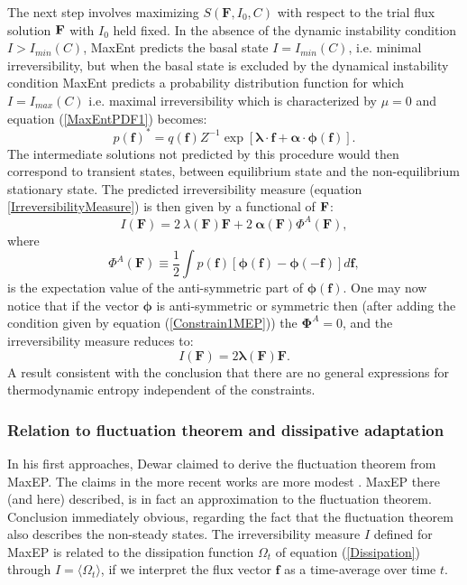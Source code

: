\documentclass[a4paper,12pt]{article}
\begin{document}
The next step involves maximizing $S(\bm{F}, I_0, C)$ with respect to the trial flux solution $\bf{F}$ with $I_0$ held fixed.
In the absence of the dynamic instability condition $I>I_{min}(C)$, MaxEnt predicts the basal state $I=I_{min}(C)$, i.e. minimal irreversibility, but when the basal state is excluded by the dynamical instability condition MaxEnt predicts a probability distribution function for which $I=I_{max}(C)$ i.e. maximal irreversibility which is characterized by $\mu =0$ and equation (\ref{MaxEntPDF1}) becomes:
\begin{equation}
\label{MaxEntPDF2}
  p(\bm{f})^* = q( \bm{f} ) Z^{-1} \exp[\bm{\lambda} \cdot \bm{f}+ \bm{\alpha} \cdot \bm{\phi} (\bm{f})].
\end{equation}
The intermediate solutions not predicted by this procedure would then correspond to transient states, between equilibrium state and the non-equilibrium stationary state.
The predicted irreversibility measure (equation \ref{IrreversibilityMeasure}) is then given by a functional of $\bf{F}$:
\begin{equation}
  I(\bm{F}) =2\ \lambda(\bm{F}) \bm{F} + 2\ \bm{\alpha(\bm{F})} \Phi^A(\bm{F}),
\end{equation}
where 
\begin{equation}
  \Phi^A(\bm{F}) \equiv \frac{1}{2} \int p(\bm{f})[\bm{\phi}(\bm{f})-\bm{\phi}(\bm{-f})]d\bm{f},
\end{equation}
is the expectation value of the anti-symmetric part of $\bm{\phi}(\bm{f})$. One may now notice that if the vector $\bm{\phi}$ is anti-symmetric or symmetric then (after adding the condition given by equation (\ref{Constrain1MEP})) the $\bm{\Phi}^A =0$, and the irreversibility measure reduces to:
\begin{equation}
\label{SymmetricIrreversible}
  I(\bm{F})=2 \bm{\lambda}(\bm{F})\bm{F}.
\end{equation}
A result consistent with the conclusion that there are no general expressions for thermodynamic entropy independent of the constraints.

\subsubsection{Relation to fluctuation theorem and dissipative adaptation}
In his first approaches, Dewar claimed to derive \cite{Dewar:775452, Dewar:2005eo} the fluctuation theorem from MaxEP. The claims in the more recent works are more modest \cite{Dewar:2014ek}. MaxEP there (and here) described, is in fact an approximation to the fluctuation theorem. Conclusion immediately obvious, regarding the fact that the fluctuation theorem also describes the non-steady states.
The irreversibility measure $I$ defined for MaxEP is related to the dissipation function $\Omega_t$ of equation (\ref{Dissipation}) through $I=\langle \Omega_t \rangle$, if we interpret the flux vector $\bm{f}$ as a time-average over time $t$. 
\end{document}
